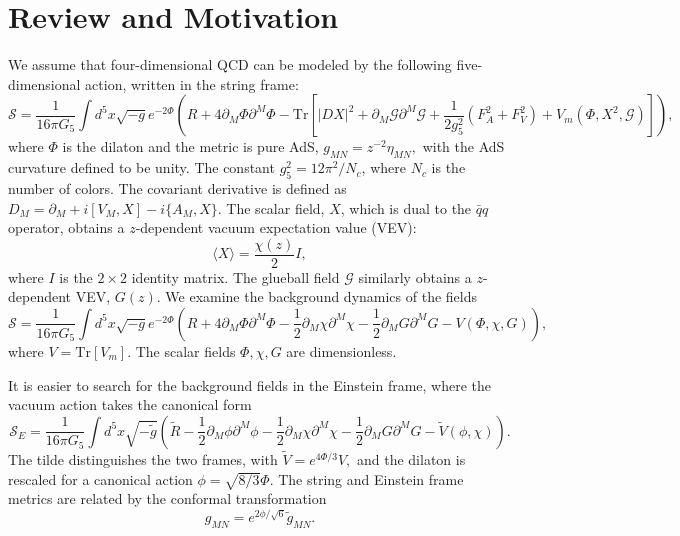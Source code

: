 \documentclass[aps,prd,12pt,nofootinbib]{revtex4}
\newcommand{\be}{\begin{equation}}
\newcommand{\ee}{\end{equation}}
\def\thalf{{\textstyle{\frac{1}{2}}}}
\newcommand{\cS}{\mathcal S}
\begin{document}
\section{Review and Motivation}
\label{secReview}

We assume that four-dimensional QCD can be modeled by the following five-dimensional action, written in the string frame:
\be
\cS =\frac{1}{16\pi G_5} \int d^5x \sqrt{-g} e^{-2\Phi}  \left(R+4\partial_M\Phi\partial^M\Phi - \mathrm{Tr} \left[ |DX|^2  +\partial_M \mathcal{G} \partial^M \mathcal{G} + \frac{1}{2g_5^2} (F_A^2+F_V^2) +V_m(\Phi,X^2, \mathcal{G}) \right]\right), 
\label{eqStringAction}
\ee
where $\Phi$ is the dilaton and the metric is pure AdS, $g_{MN}=z^{-2}\eta_{MN},$ with the AdS curvature defined to be unity.
The constant $g_5^2 = 12\pi^2/N_c$, where $N_c$ is the number of colors.
The covariant derivative is defined as $D_M = \partial_M+i[V_M,X]-i\{A_M,X\}$.
The scalar field, $X$, which is dual to the $\bar{q}q$ operator, obtains a $z$-dependent vacuum expectation value (VEV):
\be
\langle X \rangle=\frac{\chi(z)}{2}I,
\ee
where $I$ is the $2 \times 2$ identity matrix.
The glueball field $\mathcal{G}$ similarly obtains a $z$-dependent VEV, $G(z)$.
We examine the background dynamics of the fields
\be
\cS =\frac{1}{16\pi G_5} \int d^5x \sqrt{-g} e^{-2\Phi}  \left(R+4\partial_M\Phi\partial^M\Phi -\thalf\partial_M \chi \partial^M \chi -\thalf\partial_M G \partial^M G -V(\Phi,\chi,G) \right),
\ee
where $V=\mathrm{Tr}[V_m]$.
The scalar fields $\Phi,\chi,G$ are dimensionless. 

It is easier to search for the background fields in the Einstein frame, where the vacuum action takes the canonical form
\be
\cS_E=\frac{1}{16\pi G_5} \int d^5x \sqrt{-\tilde{g}}\left(\tilde{R}-\thalf\partial_M\phi\partial^M\phi -\thalf\partial_M\chi\partial^M\chi -\thalf\partial_M G \partial^M G - \tilde{V}(\phi,\chi)\right).
\label{eq:Einstein}
\ee
The tilde distinguishes the two frames, with $\tilde{V}=e^{4\Phi/3}V,$ and the dilaton is rescaled for a canonical action $\phi=\sqrt{8/3}\Phi$.
The string and Einstein frame metrics are related by the conformal transformation
\be
g_{MN}=e^{2\phi/\sqrt{6}}\tilde{g}_{MN}.
\ee
\end{document}
